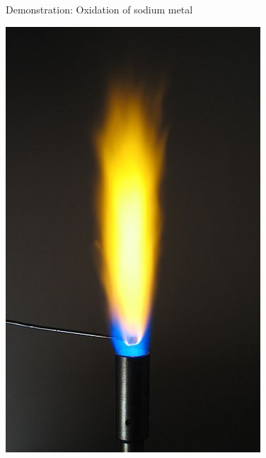 {{\begin{g_experiment}{Demonstration: Oxidation of sodium metal}
\begin{minipage}{.6\textwidth}
\par \label{m38719*eip-980}
\end{minipage}
\begin{minipage}{.4\textwidth}
 \begin{center}
  \includegraphics[width=.5\textwidth]{photos/sodium_flame_soren_wedel_nielsen_wikipedia.jpg}
 \end{center}

\end{minipage}


\end{g_experiment}}}
